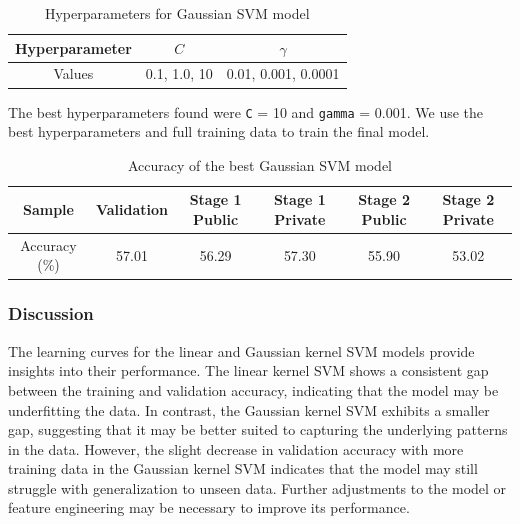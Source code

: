 \documentclass[11pt,a4paper]{article}
\begin{document}
\begin{table}[H]
  \centering
  \begin{tabular}{|c|c|c|}
  \hline
  Hyperparameter & $C$ & $\gamma$ \\ \hline
  Values & 0.1, 1.0, 10 & 0.01, 0.001, 0.0001 \\ \hline
  \end{tabular}
  \caption{Hyperparameters for Gaussian SVM model}
\end{table}

The best hyperparameters found were \texttt{C} = 10 and \texttt{gamma} = 0.001. We use the best hyperparameters and full training data to train the final model.

\begin{table}[H]
  \centering
  \begin{tabular}{|c|c|c|c|c|c|}
  \hline
  Sample & Validation & Stage 1 Public & Stage 1 Private & Stage 2 Public & Stage 2 Private \\ \hline
  Accuracy (\%) & 57.01 & 56.29 & 57.30 & 55.90 & 53.02 \\ \hline
  \end{tabular}
  \caption{Accuracy of the best Gaussian SVM model}
\end{table}



\subsubsection{Discussion}

The learning curves  for the linear and Gaussian kernel SVM models provide insights into their performance.
The linear kernel SVM shows a consistent gap between the training and validation accuracy, indicating that the model may be underfitting the data.
In contrast, the Gaussian kernel SVM exhibits a smaller gap, suggesting that it may be better suited to capturing the underlying patterns in the data.
However, the slight decrease in validation accuracy with more training data in the Gaussian kernel SVM indicates that the model may still struggle with generalization to unseen data.
Further adjustments to the model or feature engineering may be necessary to improve its performance.
\end{document}
